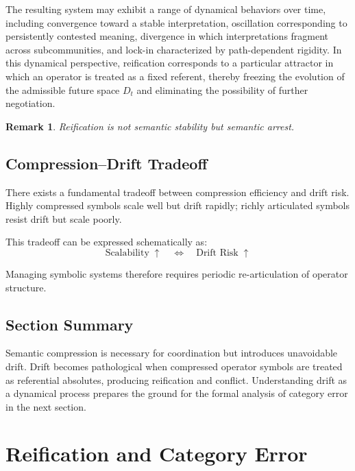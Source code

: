 \documentclass[11pt]{article}
\newtheorem{remark}{Remark}
\begin{document}
The resulting system may exhibit a range of dynamical behaviors over time,
including convergence toward a stable interpretation, oscillation corresponding
to persistently contested meaning, divergence in which interpretations fragment
across subcommunities, and lock-in characterized by path-dependent rigidity. In
this dynamical perspective, reification corresponds to a particular attractor in
which an operator is treated as a fixed referent, thereby freezing the evolution
of the admissible future space $D_t$ and eliminating the possibility of further
negotiation.


\begin{remark}
Reification is not semantic stability but semantic arrest.
\end{remark}

\subsection{Compression--Drift Tradeoff}

There exists a fundamental tradeoff between compression efficiency and drift
risk. Highly compressed symbols scale well but drift rapidly; richly articulated
symbols resist drift but scale poorly.

This tradeoff can be expressed schematically as:
\[
\text{Scalability} \;\uparrow \quad \Longleftrightarrow \quad \text{Drift Risk}
\;\uparrow
\]

Managing symbolic systems therefore requires periodic re-articulation of
operator structure.

\subsection{Section Summary}

Semantic compression is necessary for coordination but introduces unavoidable
drift. Drift becomes pathological when compressed operator symbols are treated
as referential absolutes, producing reification and conflict. Understanding drift
as a dynamical process prepares the ground for the formal analysis of category
error in the next section.

\section{Reification and Category Error}
\end{document}

